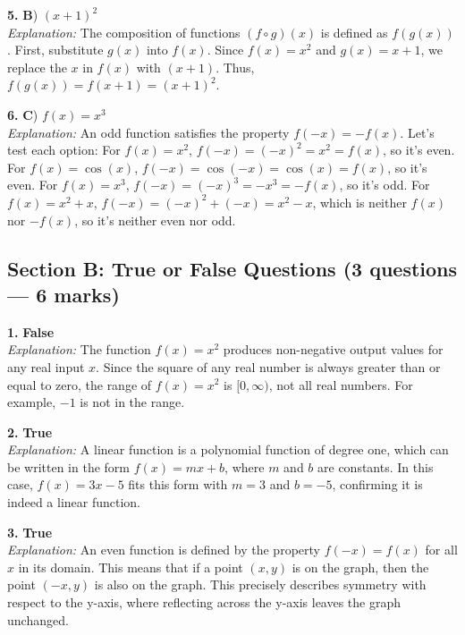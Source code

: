 \documentclass[12pt,a4paper]{article}
\begin{document}
\begin{answerbox}
\noindent\textbf{5.} \textbf{B}) $(x+1)^2$
\\ \noindent\textit{Explanation:} The composition of functions $(f \circ g)(x)$ is defined as $f(g(x))$. First, substitute $g(x)$ into $f(x)$. Since $f(x) = x^2$ and $g(x) = x+1$, we replace the $x$ in $f(x)$ with $(x+1)$. Thus, $f(g(x)) = f(x+1) = (x+1)^2$.
\end{answerbox}
\vspace{4pt}
\begin{answerbox}
\noindent\textbf{6.} \textbf{C}) $f(x) = x^3$
\\ \noindent\textit{Explanation:} An odd function satisfies the property $f(-x) = -f(x)$. Let's test each option: For $f(x)=x^2$, $f(-x)=(-x)^2=x^2=f(x)$, so it's even. For $f(x)=\cos(x)$, $f(-x)=\cos(-x)=\cos(x)=f(x)$, so it's even. For $f(x)=x^3$, $f(-x)=(-x)^3=-x^3=-f(x)$, so it's odd. For $f(x)=x^2+x$, $f(-x)=(-x)^2+(-x)=x^2-x$, which is neither $f(x)$ nor $-f(x)$, so it's neither even nor odd.
\end{answerbox}
\vspace{4pt}
\subsection*{Section B: True or False Questions \normalfont\small (3 questions --- 6 marks)}
\vspace{4pt}
\begin{answerbox}
\noindent\textbf{1.} \textbf{False}
\\ \noindent\textit{Explanation:} The function $f(x) = x^2$ produces non-negative output values for any real input $x$. Since the square of any real number is always greater than or equal to zero, the range of $f(x)=x^2$ is $[0, \infty)$, not all real numbers. For example, $-1$ is not in the range.
\end{answerbox}
\vspace{4pt}
\begin{answerbox}
\noindent\textbf{2.} \textbf{True}
\\ \noindent\textit{Explanation:} A linear function is a polynomial function of degree one, which can be written in the form $f(x) = mx + b$, where $m$ and $b$ are constants. In this case, $f(x) = 3x - 5$ fits this form with $m=3$ and $b=-5$, confirming it is indeed a linear function.
\end{answerbox}
\vspace{4pt}
\begin{answerbox}
\noindent\textbf{3.} \textbf{True}
\\ \noindent\textit{Explanation:} An even function is defined by the property $f(-x) = f(x)$ for all $x$ in its domain. This means that if a point $(x, y)$ is on the graph, then the point $(-x, y)$ is also on the graph. This precisely describes symmetry with respect to the y-axis, where reflecting across the y-axis leaves the graph unchanged.
\end{answerbox}
\vspace{4pt}
\end{document}
